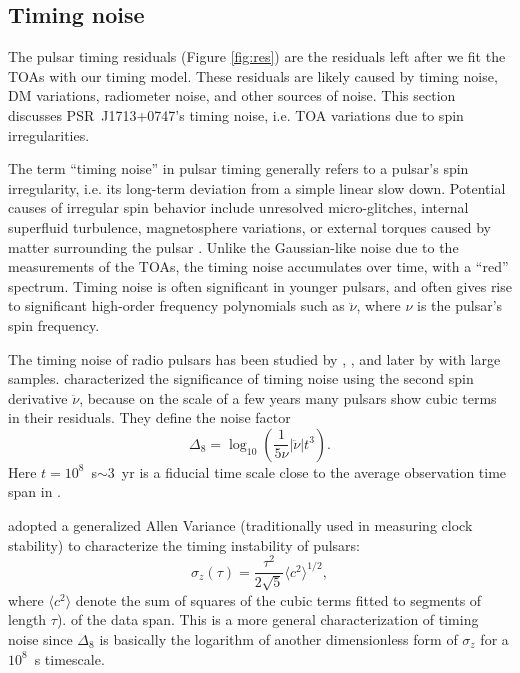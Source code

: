 \subsection{Timing noise}
\label{sec:noise}
The pulsar timing residuals (Figure \ref{fig:res}) are the residuals left
after we fit the TOAs with our timing model. 
These residuals are likely caused by timing noise, DM variations, radiometer 
noise, and other sources of noise. This section discusses PSR~J1713+0747's
timing noise, i.e. TOA variations due to spin irregularities.

The term ``timing noise'' in pulsar timing generally refers to a pulsar's spin
irregularity, i.e. its long-term deviation from a simple linear slow down. 
Potential causes of irregular spin behavior include unresolved
micro-glitches, internal superfluid turbulence, magnetosphere variations, or external torques caused by matter surrounding the pulsar
\citep{hlk10, ymh+13, ml14}.
Unlike the Gaussian-like noise due to the measurements of the TOAs, the
timing noise accumulates over time, with a ``red'' 
spectrum. Timing noise is often significant in younger pulsars, and often
gives rise to significant high-order frequency polynomials such as
$\ddot{\nu}$, where $\nu$ is the pulsar's spin frequency.

The timing noise of radio pulsars has been studied by \citet{antt94},
\citet{dmhd95}, \citet{mtem97} and later by \citet{hlk10} with large samples. 
\citet{antt94} characterized the significance of timing noise using the second
spin derivative $\ddot{\nu}$, because on the scale of a few years many
pulsars show cubic terms in their residuals. They define the noise factor 
\begin{equation}
\label{eq:delta8}
\Delta_8 = \log_{10}\left(\frac{1}{5\nu}|\ddot{\nu}|t^3\right).
\end{equation}
Here $t=10^8$~s$\sim 3$~yr is a fiducial time scale close to the average observation time span in \citet{antt94}.

\citet{mtem97} adopted a generalized Allen Variance (traditionally used in
measuring clock stability) to characterize the timing instability of pulsars:
\begin{equation}
\label{eq:sigmaz}
\sigma_z(\tau) = \frac{\tau^2}{2\sqrt{5}}\langle c^2 \rangle^{1/2},
\end{equation}
where $\langle c^2\rangle$ denote the sum of squares of the cubic
terms fitted to segments
of length $\tau$).
of the data span.
This is a more general characterization of timing noise since $\Delta_8$ is
basically the logarithm of another dimensionless form of $\sigma_z$ for
a $10^8$~s timescale.


